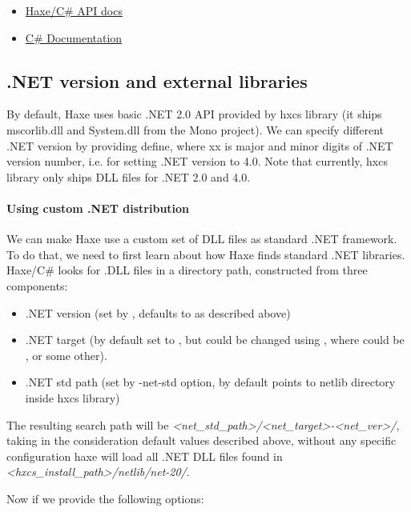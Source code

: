 \begin{itemize}
	\item \href{http://api.haxe.org/cs/}{Haxe/C# API docs}
	\item \href{https://msdn.microsoft.com/en-us/library/kx37x362.aspx}{C# Documentation}
\end{itemize}


\subsection{.NET version and external libraries}
\label{target-cs-external-libraries}

By default, Haxe uses basic .NET 2.0 API provided by hxcs library (it ships mscorlib.dll and System.dll from the Mono project). We can specify different .NET version by providing  define, where xx is major and minor digits of .NET version number, i.e.  for setting .NET version to 4.0. Note that currently, hxcs library only ships DLL files for .NET 2.0 and 4.0.

\paragraph{Using custom .NET distribution}

We can make Haxe use a custom set of DLL files as standard .NET framework. To do that, we need to first learn about how Haxe finds standard .NET libraries. Haxe/C# looks for .DLL files in a directory path, constructed from three components:

\begin{itemize}
	\item .NET version (set by , defaults to  as described above)
	\item .NET target (by default set to , but could be changed using , where  could be ,  or some other).
	\item .NET std path (set by -net-std option, by default points to netlib directory inside hxcs library)
\end{itemize}

The resulting search path will be \emph{<net_std_path>/<net_target>-<net_ver>/}, taking in the consideration default values described above, without any specific configuration haxe will load all .NET DLL files found in \emph{<hxcs_install_path>/netlib/net-20/}.

Now if we provide the following options:

